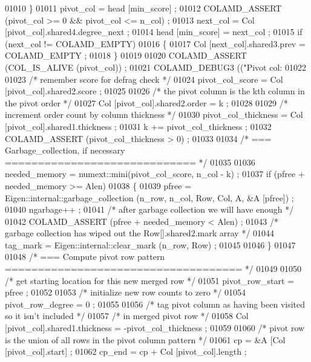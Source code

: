 \begin{DoxyCode}
{{{{{{{{{{{{{{{{{{01010     \}
01011     pivot\_col = head [min\_score] ;
01012     COLAMD\_ASSERT (pivot\_col >= 0 && pivot\_col <= n\_col) ;
01013     next\_col = Col [pivot\_col].shared4.degree\_next ;
01014     head [min\_score] = next\_col ;
01015     \textcolor{keywordflow}{if} (next\_col != COLAMD\_EMPTY)
01016     \{
01017       Col [next\_col].shared3.prev = COLAMD\_EMPTY ;
01018     \}
01019 
01020     COLAMD\_ASSERT (COL\_IS\_ALIVE (pivot\_col)) ;
01021     COLAMD\_DEBUG3 ((\textcolor{stringliteral}{"Pivot col: %
01022 
01023     \textcolor{comment}{/* remember score for defrag check */}
01024     pivot\_col\_score = Col [pivot\_col].shared2.score ;
01025 
01026     \textcolor{comment}{/* the pivot column is the kth column in the pivot order */}
01027     Col [pivot\_col].shared2.order = k ;
01028 
01029     \textcolor{comment}{/* increment order count by column thickness */}
01030     pivot\_col\_thickness = Col [pivot\_col].shared1.thickness ;
01031     k += pivot\_col\_thickness ;
01032     COLAMD\_ASSERT (pivot\_col\_thickness > 0) ;
01033 
01034     \textcolor{comment}{/* === Garbage\_collection, if necessary ============================= */}
01035 
01036     needed\_memory = numext::mini(pivot\_col\_score, n\_col - k) ;
01037     \textcolor{keywordflow}{if} (pfree + needed\_memory >= Alen)
01038     \{
01039       pfree = Eigen::internal::garbage\_collection (n\_row, n\_col, Row, Col, A, &A [pfree]) ;
01040       ngarbage++ ;
01041       \textcolor{comment}{/* after garbage collection we will have enough */}
01042       COLAMD\_ASSERT (pfree + needed\_memory < Alen) ;
01043       \textcolor{comment}{/* garbage collection has wiped out the Row[].shared2.mark array */}
01044       tag\_mark = Eigen::internal::clear\_mark (n\_row, Row) ;
01045 
01046     \}
01047 
01048     \textcolor{comment}{/* === Compute pivot row pattern ==================================== */}
01049 
01050     \textcolor{comment}{/* get starting location for this new merged row */}
01051     pivot\_row\_start = pfree ;
01052 
01053     \textcolor{comment}{/* initialize new row counts to zero */}
01054     pivot\_row\_degree = 0 ;
01055 
01056     \textcolor{comment}{/* tag pivot column as having been visited so it isn't included */}
01057     \textcolor{comment}{/* in merged pivot row */}
01058     Col [pivot\_col].shared1.thickness = -pivot\_col\_thickness ;
01059 
01060     \textcolor{comment}{/* pivot row is the union of all rows in the pivot column pattern */}
01061     cp = &A [Col [pivot\_col].start] ;
01062     cp\_end = cp + Col [pivot\_col].length ;
}}}}}}}}}}}}}}}}}}}
\end{DoxyCode}
